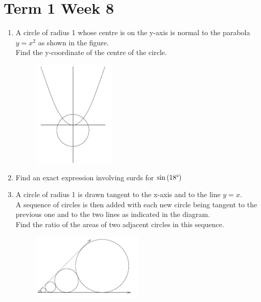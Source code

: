 \documentclass[../main.tex]{subfiles}
\begin{document}
\section*{Term 1 Week 8}
\begin{enumerate}
    \item 
    A circle of radius 1 whose centre is on the y-axis is normal to the parabola \(y=x^2\) as shown in the figure.\\
    Find the y-coordinate of the centre of the circle.\\
    \begin{figure}[h]
        \centering
        \includegraphics{images/t1w8q1.png}

    \end{figure}

    \item 
    Find an exact expression involving surds for \(\sin{(18\text{\textdegree})}\)\\

    \item 
    A circle of radius 1 is drawn tangent to the x-axis and to the line \(y=x\).\\
    
    A sequence of circles is then added with each new circle being tangent to the previous one and to the two lines as indicated in the diagram.\\
    
    Find the ratio of the areas of two adjacent circles in this sequence.\\
    \begin{figure}[h]
        \centering
        \includegraphics{images/t1w8q3.png}
    \end{figure}

    
\end{enumerate}
\end{document}
